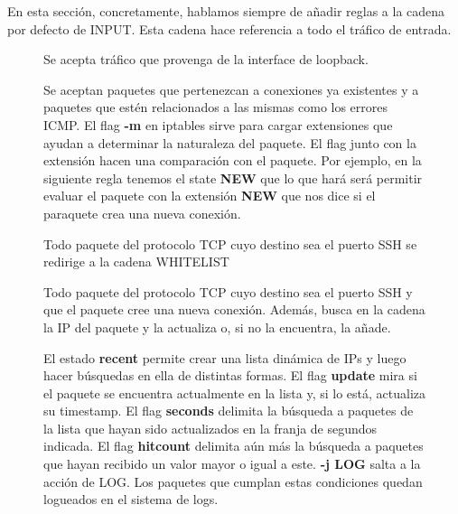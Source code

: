 \documentclass[10pt,a4paper]{article}
\begin{document}
En esta sección, concretamente, hablamos siempre de añadir reglas a la cadena por defecto de INPUT. Esta cadena hace referencia a todo el tráfico de entrada.
\begin{figure}[htpb]
	
    \caption{Se acepta tráfico que provenga de la interface de loopback.}
\end{figure}

\begin{figure}[htpb]
	
    \caption{Se aceptan paquetes que pertenezcan a conexiones ya existentes y a paquetes que estén relacionados a las mismas como los errores ICMP. El flag \textbf{-m} en iptables sirve para cargar extensiones que ayudan a determinar la naturaleza del paquete. El flag junto con la extensión hacen una comparación con el paquete. Por ejemplo, en la siguiente regla tenemos el state \textbf{NEW} que lo que hará será permitir evaluar el paquete con la extensión \textbf{NEW} que nos dice si el paraquete crea una nueva conexión.}
\end{figure}

\begin{figure}[htpb]
	
    \caption{Todo paquete del protocolo TCP cuyo destino sea el puerto SSH se redirige a la cadena WHITELIST}
\end{figure}

\begin{figure}[htpb]
	
    \caption{Todo paquete del protocolo TCP cuyo destino sea el puerto SSH y que el paquete cree una nueva conexión. Además, busca en la cadena la IP del paquete y la actualiza o, si no la encuentra, la añade.}
\end{figure}

\begin{figure}[htpb]
	
    \caption{El estado \textbf{recent} permite crear una lista dinámica de IPs y luego hacer búsquedas en ella de distintas formas. El flag \textbf{update} mira si el paquete se encuentra actualmente en la lista y, si lo está, actualiza su timestamp. El flag \textbf{seconds} delimita la búsqueda a paquetes de la lista que hayan sido actualizados en la franja de segundos indicada. El flag \textbf{hitcount} delimita aún más la búsqueda a paquetes que hayan recibido un valor mayor o igual a este. \textbf{-j LOG} salta a la acción de LOG. Los paquetes que cumplan estas condiciones quedan logueados en el sistema de logs.}
\end{figure}
\end{document}
